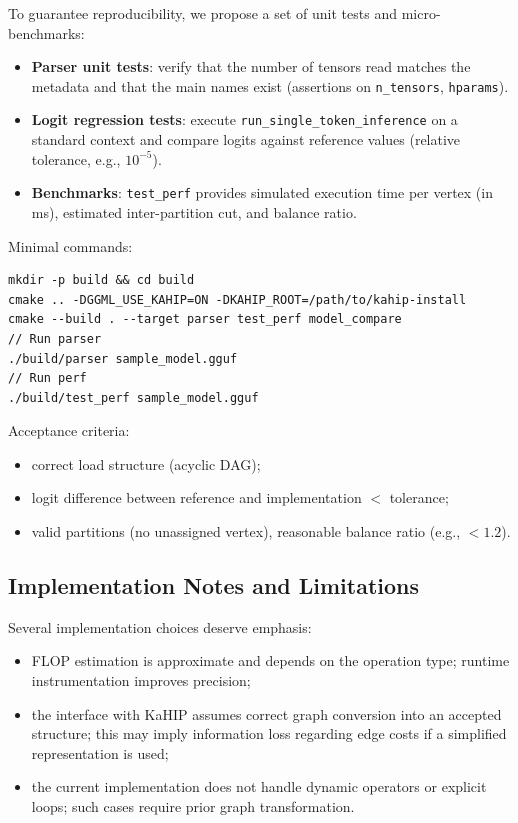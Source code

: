 \documentclass[11pt,a4paper]{article}
\begin{document}
To guarantee reproducibility, we propose a set of unit tests and micro-benchmarks:

\begin{itemize}[leftmargin=*]
	\item \textbf{Parser unit tests}: verify that the number of tensors read matches the metadata and that the main names exist (assertions on \texttt{n\_tensors}, \texttt{hparams}).
	\item \textbf{Logit regression tests}: execute \texttt{run\_single\_token\_inference} on a standard context and compare logits against reference values (relative tolerance, e.g., $10^{-5}$).
	\item \textbf{Benchmarks}: \texttt{test\_perf} provides simulated execution time per vertex (in ms), estimated inter-partition cut, and balance ratio.
\end{itemize}

Minimal commands:
\begin{verbatim}
mkdir -p build && cd build
cmake .. -DGGML_USE_KAHIP=ON -DKAHIP_ROOT=/path/to/kahip-install
cmake --build . --target parser test_perf model_compare
// Run parser
./build/parser sample_model.gguf
// Run perf
./build/test_perf sample_model.gguf
\end{verbatim}

Acceptance criteria:
\begin{itemize}[leftmargin=*]
	\item correct load structure (acyclic DAG);
	\item logit difference between reference and implementation $<$ tolerance;
	\item valid partitions (no unassigned vertex), reasonable balance ratio (e.g., $<1.2$).
\end{itemize}

\subsection{Implementation Notes and Limitations}

Several implementation choices deserve emphasis:
\begin{itemize}[leftmargin=*]
	\item FLOP estimation is approximate and depends on the operation type; runtime instrumentation improves precision;
	\item the interface with KaHIP assumes correct graph conversion into an accepted structure; this may imply information loss regarding edge costs if a simplified representation is used;
	\item the current implementation does not handle dynamic operators or explicit loops; such cases require prior graph transformation.
\end{itemize}
\end{document}
